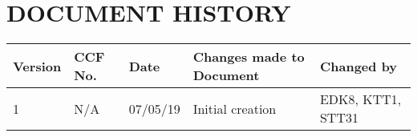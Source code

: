 \documentclass{project}
\begin{document}
\pagebreak
{}
\section*{DOCUMENT HISTORY}
\begin{tabular}{|l | l | l | l | l |}
\hline
Version & CCF No. & Date & Changes made to Document & Changed by \\
\hline
1 & N/A & 07/05/19 & Initial creation & EDK8, KTT1, STT31 \\
\hline
\end{tabular}
\label{thelastpage}
\end{document}
